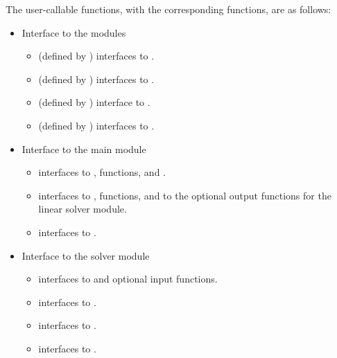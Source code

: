 The user-callable functions, with the corresponding {\kinsol} functions,
are as follows:
\begin{itemize}

\item Interface to the {\nvector} modules

  \begin{itemize}
  \item {} (defined by {\nvecs}) 
    interfaces to .
  \item {} (defined by {\nvecp}) 
    interfaces to .
  \item {} (defined by {\nvecs})
    interface to .
  \item {}  (defined by {\nvecp})
    interfaces to .
  \end{itemize}

\item Interface to the main {\kinsol} module

  \begin{itemize}
  \item {}
    interfaces to ,  functions, and .
  \item {}
    interfaces to ,  functions, and to the optional
    output functions for the {\kinspgmr} linear solver module.
  \item {}    
    interfaces to .
  \end{itemize}  

\item Interface to the {\kinspgmr} solver module

  \begin{itemize}
  \item {}
    interfaces to  and {\spgmr} optional input functions.
  \item {}
   interfaces to .
 \item {}
   interfaces to .
 \item {}
   interfaces to .
 \end{itemize}

\end{itemize}


